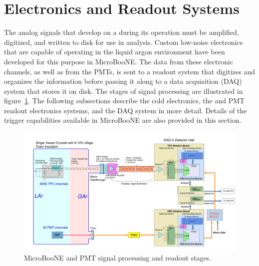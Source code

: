 \section{Electronics and Readout Systems}
\label{sec:electronics}

The analog signals that develop on a \lartpc during its operation must be amplified, digitized, and written to disk for use in analysis.  Custom low-noise electronics that are capable of operating in the liquid argon environment have been developed for this purpose in MicroBooNE.  The data from these \lartpc electronic channels, as well as from the PMTs, is sent to a readout system that digitizes and organizes the information before passing it along to a data acquisition (DAQ) system that stores it on disk.  The stages of signal processing are illustrated in figure~\ref{readout_1}.  The following subsections describe the \lartpc cold electronics, the \lartpc and PMT readout electronics systems, and the DAQ system in more detail.  Details of the trigger capabilities available in MicroBooNE are also provided in this section.

\begin{figure}
\centering
\includegraphics[width=0.95\linewidth]{./figures/MicroBooNEReadoutScheme.pdf}%
\caption{\label{readout_1}MicroBooNE \lartpc and PMT signal processing and readout stages.}
\end{figure}




